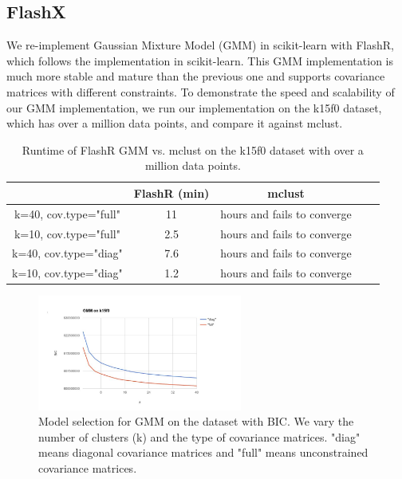\documentclass[simplex.tex]{subfiles}
\begin{document}
\subsection{FlashX}

We re-implement Gaussian Mixture Model (GMM) in scikit-learn with FlashR,
which follows
the implementation in scikit-learn. This GMM implementation is much more
stable and mature than the previous one and supports covariance matrices
with different constraints. To demonstrate the speed and scalability of
our GMM implementation, we run our implementation on the k15f0 dataset,
which has over a million data points, and compare it against mclust.

\begin{table}
\begin{center}
\caption{Runtime of FlashR GMM vs. mclust on the k15f0 dataset with over
a million data points.}
\vspace{-10pt}
\footnotesize
\begin{tabular}{|c|c|c|c|c|}
\hline
& FlashR (min) & mclust \\
\hline
k=40, cov.type="full" & 11 & hours and fails to converge \\
\hline
k=10, cov.type="full" & 2.5 & hours and fails to converge \\
\hline
k=40, cov.type="diag" & 7.6 & hours and fails to converge \\
\hline
k=10, cov.type="diag" & 1.2 & hours and fails to converge \\
\hline
\end{tabular}
\normalsize
\label{tbl:GMM}
\end{center}
\vspace{-10pt}
\end{table}

\begin{figure}[!h]
\begin{cframed}
\centering
\includegraphics[width=0.6\textwidth]{../../figs/GMM.jpg}
\caption{Model selection for GMM on the dataset with BIC. We vary
the number of clusters (k) and the type of covariance matrices.
"diag" means diagonal covariance matrices and "full" means unconstrained
covariance matrices.}
\label{fig:FlashX2}
\end{cframed}
\end{figure}
\end{document}
